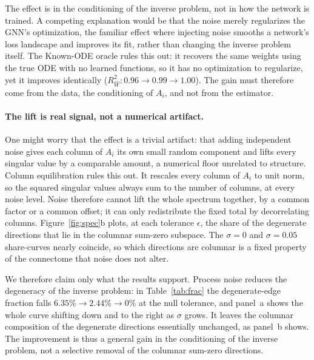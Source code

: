 \documentclass[11pt]{article}
\newcommand{\Rw}{R^2_{\widehat W}}
\begin{document}
\noindent The effect is in the conditioning of the inverse problem, not in how the
network is trained. A competing explanation would be that the noise merely
regularizes the GNN's optimization, the familiar effect where injecting noise
smooths a network's loss landscape and improves its fit, rather than changing the
inverse problem itself. The Known-ODE oracle rules this out: it recovers the same
weights using the true ODE with no learned functions, so it has no optimization to
regularize, yet it improves identically ($\Rw:0.96\to0.99\to1.00$). The gain must
therefore come from the data, the conditioning of $A_i$, and not from the
estimator.

\paragraph{The lift is real signal, not a numerical artifact.}
One might worry that the effect is a trivial artifact: that adding independent
noise gives each column of $A_i$ its own small random component and lifts every
singular value by a comparable amount, a numerical floor unrelated to structure.
Column equilibration rules this out. It rescales every column of $A_i$ to unit
norm, so the squared singular values always sum to the number of columns, at every
noise level. Noise therefore cannot lift the whole spectrum together, by a common
factor or a common offset; it can only redistribute the fixed total by
decorrelating columns. Figure~\ref{fig:spec}b
plots, at each tolerance $\epsilon$, the share of the degenerate directions that
lie in the columnar sum-zero subspace. The $\sigma=0$ and $\sigma=0.05$
share-curves nearly coincide, so which directions are columnar is a fixed property
of the connectome that noise does not alter.

We therefore claim only what the results support. Process noise reduces the
degeneracy of the inverse problem: in Table~\ref{tab:frac} the degenerate-edge
fraction falls $6.35\%\to2.44\%\to0\%$ at the null tolerance, and panel~a shows the
whole curve shifting down and to the right as $\sigma$ grows. It leaves the
columnar composition of the degenerate directions essentially unchanged, as
panel~b shows. The improvement is thus a general gain in the conditioning of the
inverse problem, not a selective removal of the columnar sum-zero directions.
\end{document}
